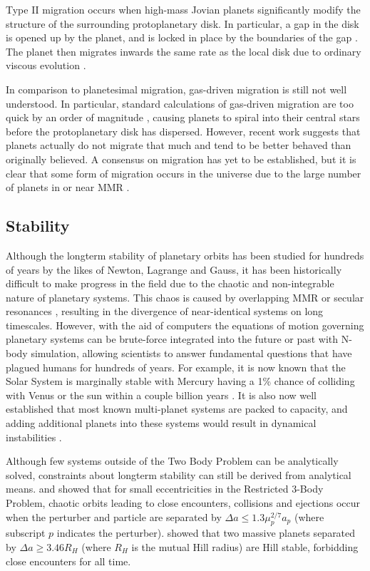 \documentclass[12pt,letter]{aastex}
\begin{document}
Type II migration occurs when high-mass Jovian planets significantly modify the structure of the surrounding protoplanetary disk. 
In particular, a gap in the disk is opened up by the planet, and is locked in place by the boundaries of the gap \citep{Armitage2010}.
The planet then migrates inwards the same rate as the local disk due to ordinary viscous evolution \citep{Armitage2010}.  

In comparison to planetesimal migration, gas-driven migration is still not well understood. 
In particular, standard calculations of gas-driven migration are too quick by an order of magnitude \citep{Lin1986, Tanaka2002}, causing planets to spiral into their central stars before the protoplanetary disk has dispersed.
However, recent work \citep{Fung2017} suggests that planets actually do not migrate that much and tend to be better behaved than originally believed. 
A consensus on migration has yet to be established, but it is clear that some form of migration occurs in the universe due to the large number of planets in or near MMR \citep{Lissauer2011,Fabrycky2014,Steffen2015}.

\subsection{Stability}
Although the longterm stability of planetary orbits has been studied for hundreds of years by the likes of Newton, Lagrange and Gauss, it has been historically difficult to make progress in the field due to the chaotic and non-integrable nature of planetary systems.  
This chaos is caused by overlapping MMR or secular resonances \citep{Chirikov1979, Lecar2001}, resulting in the divergence of near-identical systems on long timescales. 
However, with the aid of computers the equations of motion governing planetary systems can be brute-force integrated into the future or past with N-body simulation, allowing scientists to answer fundamental questions that have plagued humans for hundreds of years. 
For example, it is now known that the Solar System is marginally stable \citep{Sussman1988, Laskar1994, Lecar2001} with Mercury having a 1\% chance of colliding with Venus or the sun within a couple billion years \citep{Laskar2009}.
It is also now well established that most known multi-planet systems are packed to capacity, and adding additional planets into these systems would result in dynamical instabilities \citep{Fang2013,Pu2015}.

Although few systems outside of the Two Body Problem can be analytically solved, constraints about longterm stability can still be derived from analytical means.
\citet{Wisdom1980} and \citet{Duncan1989} showed that for small eccentricities in the Restricted 3-Body Problem, chaotic orbits leading to close encounters, collisions and ejections occur when the perturber and particle are separated by $\Delta a \le 1.3\mu_p^{2/7}a_p$ (where subscript $p$ indicates the perturber). 
\citet{Gladman1993} showed that two massive planets separated by $\Delta a \ge 3.46 R_H$ (where $R_H$ is the mutual Hill radius) are Hill stable, forbidding close encounters for all time. 
\end{document}
